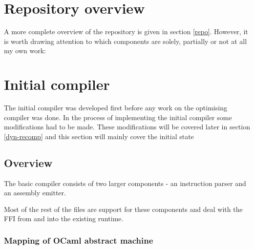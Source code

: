 \section{Repository overview}

A more complete overview of the repository is given in section \ref{repo}. However, it is worth
drawing attention to which components are solely, partially or not at all my own work:


\section{Initial compiler}

The initial compiler was developed first before any work on the optimising compiler was done. In
the process of implementing the
initial compiler some modifications had to be made. These modifications will be covered later in
section \ref{dyn-recomp} and this section will mainly cover the initial state

\subsection{Overview}

The basic compiler consists of two larger components - an instruction parser and an assembly
emitter.

Most of the rest of the files are support for these components and deal with the FFI from and into
the existing runtime.

\subsubsection{Mapping of OCaml abstract machine}

